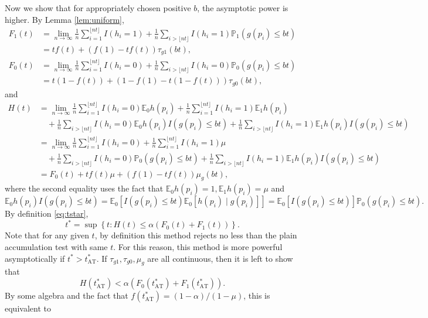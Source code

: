\documentclass{biometrika}
\newcommand{\E}{\mathbb{E}}
\renewcommand{\P}{\mathbb{P}}
\newcommand{\1}{\mathbf{1}}
\begin{document}
Now we show that for appropriately chosen positive $b$, the asymptotic power is higher. By Lemma \ref{lem:uniform}, 
\begin{align*}
  F_{1}(t) &= \lim_{n\rightarrow \infty}\frac{1}{n}\sum_{i=1}^{\lfloor nt\rfloor}I(h_{i} = 1) + \frac{1}{n}\sum_{i > \lfloor nt \rfloor}I(h_{i} = 1)\P_{1}(g(p_{i})\le bt)\\
& = tf(t) + (f(1) - tf(t))\tau_{g1}(bt),
\end{align*}
\begin{align*}
  F_{0}(t) &= \lim_{n\rightarrow \infty}\frac{1}{n}\sum_{i=1}^{\lfloor nt\rfloor}I(h_{i} = 0) + \frac{1}{n}\sum_{i > \lfloor nt \rfloor}I(h_{i} = 0)\P_{0}(g(p_{i})\le bt)\\
& = t(1 - f(t)) + (1 - f(1) - t(1 - f(t)))\tau_{g0}(bt),
\end{align*}
and 
\begin{align*}
  H(t)& = \lim_{n\rightarrow \infty}\frac{1}{n}\sum_{i=1}^{\lfloor nt\rfloor}I(h_{i} = 0)\E_{0}h(p_{i}) + \frac{1}{n}\sum_{i=1}^{\lfloor nt\rfloor}I(h_{i} = 1)\E_{1}h(p_{i})\\
&\quad  + \frac{1}{n}\sum_{i > \lfloor nt \rfloor}I(h_{i} = 0)\E_{0}h(p_{i})I(g(p_{i})\le bt)  + \frac{1}{n}\sum_{i > \lfloor nt \rfloor}I(h_{i} = 1)\E_{1}h(p_{i})I(g(p_{i})\le bt)\\
& = \lim_{n\rightarrow \infty}\frac{1}{n}\sum_{i=1}^{\lfloor nt\rfloor}I(h_{i} = 0) + \frac{1}{n}\sum_{i=1}^{\lfloor nt\rfloor}I(h_{i} = 1)\mu\\
&\quad  + \frac{1}{n}\sum_{i > \lfloor nt \rfloor}I(h_{i} = 0)\P_{0}(g(p_{i})\le bt)  + \frac{1}{n}\sum_{i > \lfloor nt \rfloor}I(h_{i} = 1)\E_{1}h(p_{i})I(g(p_{i})\le bt)\\
& = F_{0}(t) + tf(t)\mu + (f(1) - tf(t))\mu_{g}(bt),
\end{align*}
where the second equality uses the fact that $\E_{0} h(p_{i}) = 1, \E_{1} h(p_{i}) = \mu$ and 
\[\E_{0}h(p_{i})I(g(p_{i})\le bt) = \E_{0}[I(g(p_{i})\le bt)\E_{0}[h(p_{i})\mid g(p_{i})]] = \E_{0}[I(g(p_{i})\le bt)] \P_{0}(g(p_{i})\le bt).\]
By definition \eqref{eq:tstar},
\[t^{*} = \sup\left\{t: H(t) \le \alpha (F_{0}(t) + F_{1}(t))\right\}.\]
Note that for any given $t$, by definition this method rejects no less than the plain accumulation test with same $t$. For this reason, this method is more powerful asymptotically if $t^{*} > t_{\mathrm{AT}}^{*}$. If $\tau_{g1}, \tau_{g0}, \mu_{g}$ are all continuous, then it is left to show that
\[H(t_{\mathrm{AT}}^{*}) < \alpha (F_{0}(t_{\mathrm{AT}}^{*}) + F_{1}(t_{\mathrm{AT}}^{*})).\]
By some algebra and the fact that $f(t_{\mathrm{AT}}^{*}) = (1 - \alpha) / (1 - \mu)$, this is equivalent to
\end{document}
